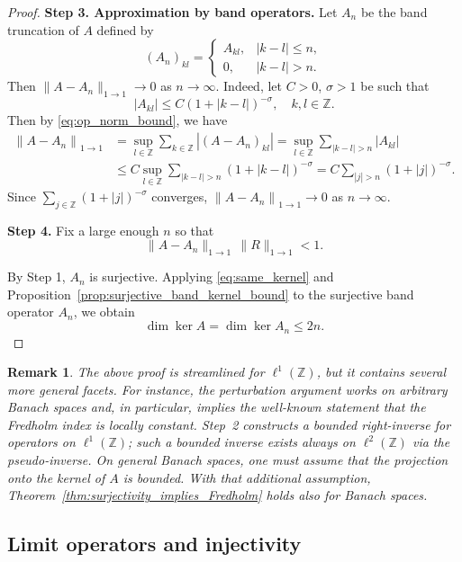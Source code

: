 \documentclass[reqno,a4paper,12pt]{amsart}
\numberwithin{equation}{section}
\newtheorem{remark}[definition]{Remark}
\def\Z{{\mathbb Z}}
\newcommand\1{\mathds{1}}
\newcommand{\norm}[1]{\left\lVert #1 \right\rVert}
\begin{document}
\begin{proof}
\textbf{Step 3. Approximation by band operators.}
Let $A_n$ be the band truncation of $A$  defined by
$$
(A_n)_{kl}=
\begin{cases}
A_{kl}, & |k-l|\leq n,\\
0, & |k-l|>n .
\end{cases}
$$
Then 
$
\|A-A_n\|_{1\to1} \to 0
$
as $n \to \infty$. Indeed, 
   let $C>0$, $\sigma>1$ be such that 
   \begin{equation}
       |A_{kl}|\le C(1+|k-l|)^{-\sigma},
\quad k,l\in\mathbb Z.
   \end{equation}
   Then by \eqref{eq:op_norm_bound}, we have
   \begin{align}
       \norm{A-A_n}_{1 \to 1} & =\sup\limits_{l\in\Z}\sum\limits_{k\in\Z}|(A-A_n)_{kl}| = \sup\limits_{l\in\Z}\sum\limits_{|k-l|>n}|A_{kl}| \\
       & \leq  C \sup\limits_{l\in\Z}\sum\limits_{|k-l|>n} (1+|k-l|)^{-\sigma} 
       = C \sum\limits_{|j|>n} (1+|j|)^{-\sigma}.
   \end{align}
   Since $\sum\limits_{j\in\Z} (1+|j|)^{-\sigma}$ converges, $\norm{A-A_n}_{1\to 1}\to 0$ as $n\to \infty$.

\textbf{Step 4.}
Fix a large enough $n$ so that
$$
\|A-A_n\|_{1\to1}\,\|R\|_{1\to1}<1 .
$$

By Step 1, $A_n$ is surjective. 
Applying \eqref{eq:same_kernel} and Proposition~\ref{prop:surjective_band_kernel_bound} to the surjective band operator $A_n$, we obtain
\begin{equation}
    \dim\ker A= \dim\ker A_n \leq 2n.
\end{equation}
\end{proof}
\begin{remark} {\rm
  The above proof is streamlined for $\ell ^1(\Z )$, but it contains 
  several more general facets. For instance, the perturbation argument
  works on arbitrary Banach spaces and, in particular, implies the
  well-known statement that the Fredholm index is locally
  constant. Step~2 constructs a bounded right-inverse for operators on
  $\ell ^1(\Z )$; such a bounded inverse exists always on $\ell ^2(\Z
  )$ via the pseudo-inverse. On general Banach spaces, one must assume
  that the projection onto the kernel of $A$ is bounded. With that
  additional assumption, 
  Theorem~\ref{thm:surjectivity_implies_Fredholm} holds also for Banach spaces.  }
\end{remark}


\subsection{Limit operators and injectivity}
\end{document}
